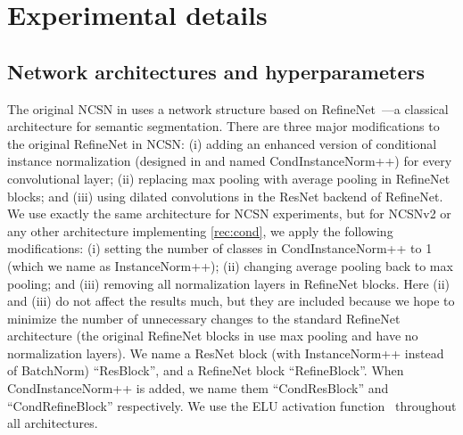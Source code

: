 \documentclass{article}
\begin{document}
\section{Experimental details}\label{app:exp_details}
\subsection{Network architectures and hyperparameters}\label{app:arch}
The original NCSN in \cite{song2019generative} uses a network structure based on RefineNet~\cite{lin2017refinenet}---a classical architecture for semantic segmentation. There are three major modifications to the original RefineNet in NCSN: (i) adding an enhanced version of conditional instance normalization (designed in \cite{song2019generative} and named CondInstanceNorm++) for every convolutional layer; (ii) replacing max pooling with average pooling in RefineNet blocks; and (iii) using dilated convolutions in the ResNet backend of RefineNet. We use exactly the same architecture for NCSN experiments, but for NCSNv2 or any other architecture implementing \cref{rec:cond}, we apply the following modifications: (i) setting the number of classes in CondInstanceNorm++ to 1 (which we name as InstanceNorm++); (ii) changing average pooling back to max pooling; and (iii) removing all normalization layers in RefineNet blocks. Here (ii) and (iii) do not affect the results much, but they are included because we hope to minimize the number of unnecessary changes to the standard RefineNet architecture (the original RefineNet blocks in \cite{lin2017refinenet} use max pooling and have no normalization layers). We name a ResNet block (with InstanceNorm++ instead of BatchNorm) ``ResBlock'', and a RefineNet block ``RefineBlock''. When CondInstanceNorm++ is added, we name them ``CondResBlock'' and ``CondRefineBlock'' respectively. We use the ELU activation function~\cite{clevert2015fast} throughout all architectures.
\end{document}
